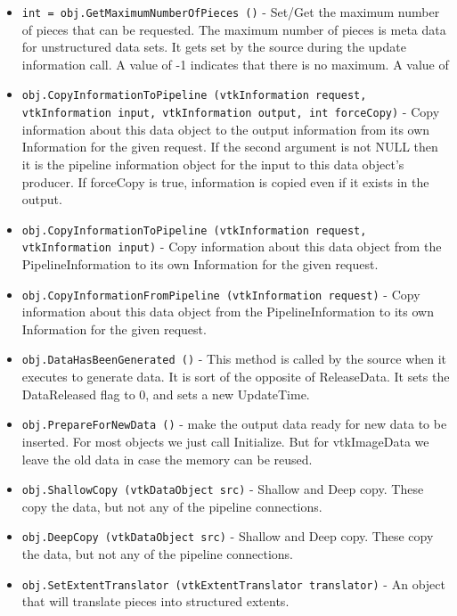 \begin{itemize}
\item  \verb|int = obj.GetMaximumNumberOfPieces ()| -  Set/Get the maximum number of pieces that can be requested.  
 The maximum number of pieces is meta data for unstructured data sets.
 It gets set by the source during the update information call.
 A value of -1 indicates that there is no maximum.  A value of

\item  \verb|obj.CopyInformationToPipeline (vtkInformation request, vtkInformation input, vtkInformation output, int forceCopy)| -  Copy information about this data object to the output
 information from its own Information for the given
 request.  If the second argument is not NULL then it is the
 pipeline information object for the input to this data object's
 producer. If forceCopy is true, information is copied even
 if it exists in the output.

\item  \verb|obj.CopyInformationToPipeline (vtkInformation request, vtkInformation input)| -  Copy information about this data object from the
 PipelineInformation to its own Information for the given request.

\item  \verb|obj.CopyInformationFromPipeline (vtkInformation request)| -  Copy information about this data object from the
 PipelineInformation to its own Information for the given request.

\item  \verb|obj.DataHasBeenGenerated ()| -  This method is called by the source when it executes to generate data.
 It is sort of the opposite of ReleaseData.
 It sets the DataReleased flag to 0, and sets a new UpdateTime.

\item  \verb|obj.PrepareForNewData ()| -  make the output data ready for new data to be inserted. For most 
 objects we just call Initialize. But for vtkImageData we leave the old
 data in case the memory can be reused.

\item  \verb|obj.ShallowCopy (vtkDataObject src)| -  Shallow and Deep copy.  These copy the data, but not any of the 
 pipeline connections.

\item  \verb|obj.DeepCopy (vtkDataObject src)| -  Shallow and Deep copy.  These copy the data, but not any of the 
 pipeline connections.

\item  \verb|obj.SetExtentTranslator (vtkExtentTranslator translator)| -  An object that will translate pieces into structured extents.


\end{itemize}
